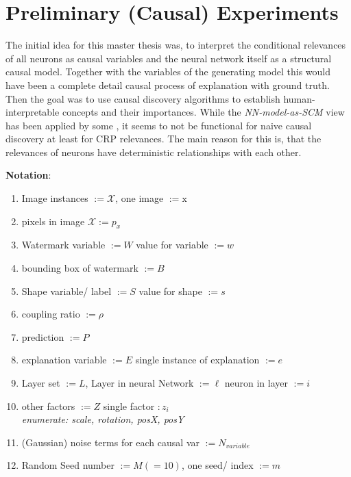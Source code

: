 { \color{gray}
\section{Preliminary (Causal) Experiments}
The initial idea for this master thesis was, to interpret the conditional relevances of all neurons as causal variables and the neural network itself as a structural causal model. Together with the variables of the generating model this would have been a complete detail causal process of explanation with ground truth. Then the goal was to use causal discovery algorithms to establish human-interpretable concepts and their importances. While the \textit{NN-model-as-SCM} view has been applied by some \cite{Narendra2018,Chattopadhyay2019}, it seems to not be functional for naive causal discovery at least for CRP relevances. The main reason for this is, that the relevances of neurons have deterministic relationships with each other. 
} 
{\color{codepurple} 
\textbf{Notation}:
\begin{enumerate}
    \item Image instances $:= \mathcal{X}$, one image $:= \mathrm{x}$
    \item pixels in image $\mathcal{X} := p_x$
    \item Watermark variable $:= W$ value for variable $:= w$
    \item bounding box of watermark $:= B$
    \item Shape variable/ label $:= S$ value for shape $:= s$
    \item coupling ratio $:= \rho$
    \item prediction $:= P$
    \item explanation variable $:= E$ single instance of explanation $:= e$
    \item Layer set $:= L$, Layer in neural Network $:= \ell$ neuron in layer $:= i$
    \item other factors $:= Z$ single factor $:z_i$ \\ 
    \textit{enumerate: scale, rotation, posX, posY}
    \item (Gaussian) noise terms for each causal var $:= N_{variable}$
    \item Random Seed number $:= M (=10)$, one seed/ index $:=m$
\end{enumerate}


}